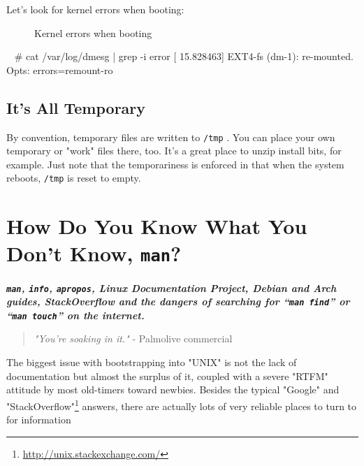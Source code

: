 \documentclass[10pt,american,]{book}
\newenvironment{Shaded}{\begin{snugshade}}{\end{snugshade}}
\newcommand{\KeywordTok}[1]{\textcolor[rgb]{0.13,0.29,0.53}{\textbf{{#1}}}}
\newcommand{\CommentTok}[1]{\textcolor[rgb]{0.56,0.35,0.01}{\textit{{#1}}}}
\newcommand{\NormalTok}[1]{{#1}}
\renewcommand{\href}[2]{#2\footnote{\url{#1}}}
\numberwithin{figure}{chapter}
\DeclareRobustCommand{\drcap}[1]{\begin{figure}[H]\caption{#1}\end{figure}}
\renewcommand{\KeywordTok}[1]{{#1}}
\renewcommand{\CommentTok}[1]{{#1}}
\renewcommand{\NormalTok}[1]{{#1}}
\begin{document}
Let's look for kernel errors when booting:

\drcap{Kernel errors when booting}

\begin{Shaded}
\begin{Highlighting}[]
\KeywordTok{~} \CommentTok{# cat /var/log/dmesg | grep -i error}
\KeywordTok{[}   \NormalTok{15.828463] EXT4-fs (dm-1): re-mounted. Opts: errors=remount-ro}
\end{Highlighting}
\end{Shaded}

\section*{It's All Temporary}\label{its-all-temporary}

By convention, temporary files are written to \texttt{/tmp} . You can
place your own temporary or "work" files there, too. It's a great place
to unzip install bits, for example. Just note that the temporariness is
enforced in that when the system reboots, \texttt{/tmp} is reset to
empty. 

\hypertarget{how-do-you-know-what-you-dont-know-man}{\chapter{\texorpdfstring{How
Do You Know What You Don’t Know,
\texttt{man}?}{How Do You Know What You Don’t Know, man?}}\label{how-do-you-know-what-you-dont-know-man}}

\textbf{\emph{\texttt{man}, \texttt{info}, \texttt{apropos}, Linux
Documentation Project, Debian and Arch guides, StackOverflow and the
dangers of searching for “\texttt{man\ find}” or “\texttt{man\ touch}”
on the internet.}}

\begin{quote}
\emph{"You're soaking in it."} - Palmolive commercial
\end{quote}

The biggest issue with bootstrapping into "UNIX" is not the lack of
documentation but almost the surplus of it, coupled with a severe "RTFM"
attitude by most old-timers toward newbies. Besides the typical "Google"
and \href{http://unix.stackexchange.com/}{"StackOverflow"} answers,
there are actually lots of very reliable places to turn to for
information
\end{document}
